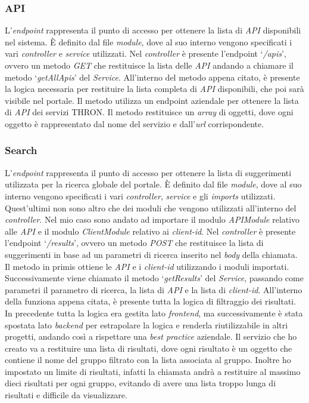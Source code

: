 \subsubsection{API}
L'\textit{endpoint} rappresenta il punto di accesso per ottenere la lista di \textit{API} disponibili nel sistema.
È definito dal file \textit{module}, dove al suo interno vengono specificati i vari \textit{controller} e \textit{service} utilizzati.
Nel \textit{controller} è presente l'endpoint `\textit{/apis}', ovvero un metodo \textit{GET} che restituisce la lista delle \textit{API} andando
a chiamare il metodo `\textit{getAllApis}' del \textit{Service}.
All'interno del metodo appena citato, è presente la logica necessaria per restituire la lista completa di \textit{API} disponibili, che poi sarà visibile nel portale.
Il metodo utilizza un endpoint aziendale per ottenere la lista di \textit{API} dei servizi THRON.
Il metodo restituisce un \textit{array} di oggetti, dove ogni oggetto è rappresentato dal nome del servizio e dall'\textit{url} corrispondente.

\subsubsection{Search}
L'\textit{endpoint} rappresenta il punto di accesso per ottenere la lista di suggerimenti utilizzata per la ricerca globale del portale.
È definito dal file \textit{module}, dove al suo interno vengono specificati i vari \textit{controller}, \textit{service} e gli \textit{imports} utilizzati. 
Quest'ultimi non sono altro che dei moduli che vengono utilizzati all'interno del \textit{controller}. Nel mio caso sono andato ad importare il modulo \textit{APIModule}
relativo alle \textit{API} e il modulo \textit{ClientModule} relativo ai \textit{client-id}.
Nel \textit{controller} è presente l'endpoint `\textit{/results}', ovvero un metodo \textit{POST} che restituisce la lista di suggerimenti in base ad un parametri di ricerca
inserito nel \textit{body} della chiamata. Il metodo in primis ottiene le \textit{API} e i \textit{client-id} utilizzando i moduli importati. 
Successivamente viene chiamato il metodo `\textit{getResults}' del \textit{Service}, passando come parametri il parametro di ricerca, la lista di \textit{API} e la lista di \textit{client-id}.
All'interno della funziona appena citata, è presente tutta la logica di filtraggio dei risultati. In precedente tutta la logica era gestita lato \textit{frontend}, ma successivamente 
è stata spostata lato \textit{backend} per estrapolare la logica e renderla riutilizzabile in altri progetti, andando così a rispettare una \textit{best practice} aziendale.
Il servizio che ho creato va a restituire una lista di risultati, dove ogni risultato è un oggetto che contiene il nome del gruppo filtrato con la lista associata al gruppo.
Inoltre ho impostato un limite di risultati, infatti la chiamata andrà a restituire al massimo dieci risultati per ogni gruppo, evitando di avere una lista troppo lunga di risultati e difficile 
da visualizzare.
